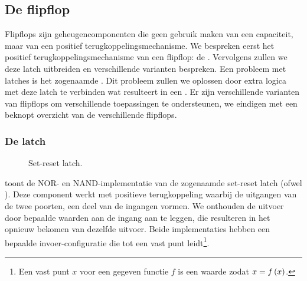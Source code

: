 \subsection{De flipflop}
Flipflops zijn geheugencomponenten die geen gebruik maken van een capaciteit, maar van een positief terugkoppelingsmechanisme. We bespreken eerst het positief terugkoppelingsmechanisme van een flipflop: de . Vervolgens zullen we deze latch uitbreiden en verschillende varianten bespreken. Een probleem met latches is het zogenaamde . Dit probleem zullen we oplossen door extra logica met deze latch te verbinden wat resulteert in een . Er zijn verschillende varianten van flipflops om verschillende toepassingen te ondersteunen, we eindigen met een beknopt overzicht van de verschillende flipflops.

\subsubsection{De latch}

\begin{figure}[hbt]
\centering
{}
\caption{Set-reset latch.}
\end{figure}

 toont de NOR- en NAND-implementatie van de zogenaamde set-reset latch (ofwel ). Deze component werkt met positieve terugkoppeling waarbij de uitgangen van de twee poorten, een deel van de ingangen vormen. We onthouden de uitvoer door bepaalde waarden aan de ingang aan te leggen, die resulteren in het opnieuw bekomen van dezelfde uitvoer. Beide implementaties hebben een bepaalde invoer-configuratie die tot een vast punt leidt\footnote{Een vast punt $x$ voor een gegeven functie $f$ is een waarde zodat $x=f\left( x \right)$.}.

